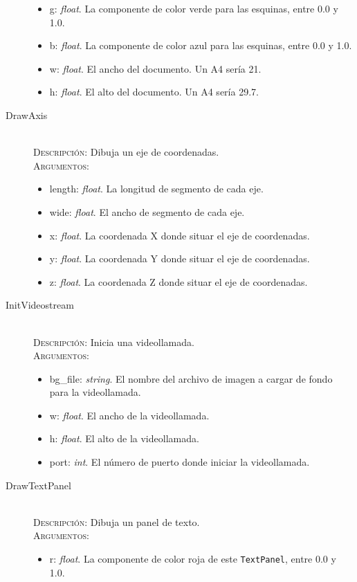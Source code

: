 \begin{description}
\begin{itemize}
  \item g: \textit{float}. La componente de color verde para las esquinas, entre 0.0 y 1.0.
  \item b: \textit{float}. La componente de color azul para las esquinas, entre 0.0 y 1.0.
  \item w: \textit{float}. El ancho del documento. Un A4 sería 21.
  \item h: \textit{float}. El alto del documento. Un A4 sería 29.7.
  \end{itemize}
\item[DrawAxis] \hfill \\
  \textsc{Descripción:} Dibuja un eje de coordenadas. \\
  \textsc{Argumentos:}
  \begin{itemize}
  \item length: \textit{float}. La longitud de segmento de cada eje.
  \item wide: \textit{float}. El ancho de segmento de cada eje.
  \item x: \textit{float}. La coordenada X donde situar el eje de coordenadas.
  \item y: \textit{float}. La coordenada Y donde situar el eje de coordenadas.
  \item z: \textit{float}. La coordenada Z donde situar el eje de coordenadas.
  \end{itemize}
\item[InitVideostream] \hfill \\
  \textsc{Descripción:} Inicia una videollamada. \\
  \textsc{Argumentos:}
  \begin{itemize}
  \item bg\_file: \textit{string}. El nombre del archivo de imagen a cargar de fondo para la videollamada.
  \item w: \textit{float}. El ancho de la videollamada.
  \item h: \textit{float}. El alto de la videollamada.
  \item port: \textit{int}. El número de puerto donde iniciar la videollamada.
  \end{itemize}
\item[DrawTextPanel] \hfill \\
  \textsc{Descripción:} Dibuja un panel de texto. \\
  \textsc{Argumentos:}
  \begin{itemize}
  \item r: \textit{float}. La componente de color roja de este \texttt{TextPanel}, entre 0.0 y 1.0.

\end{itemize}
\end{description}

